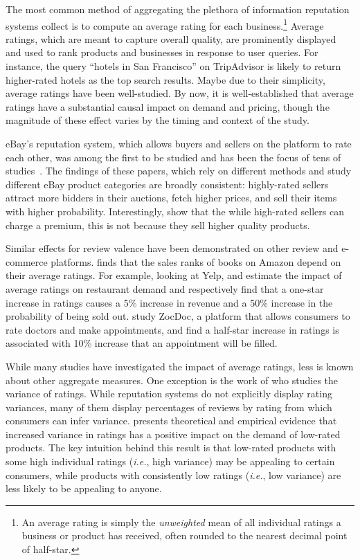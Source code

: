 \documentclass[letter,12pt]{article}
\begin{document}
The most common method of aggregating the plethora of information reputation
systems collect is to compute an average rating for each business.\footnote{An
average rating is simply the \emph{unweighted} mean of all individual ratings
a business or product has received, often rounded to the nearest decimal point
of half-star.} Average ratings, which are meant to capture overall quality,
are prominently displayed and used to rank products and businesses in response
to user queries. For instance, the query ``hotels in San Francisco'' on
TripAdvisor is likely to return higher-rated hotels as the top search results.
Maybe due to their simplicity, average ratings have been well-studied. By now,
it is well-established that average ratings have a substantial causal impact
on demand and pricing, though the magnitude of these effect varies by the
timing and context of the study.

eBay's reputation system, which allows buyers and sellers on the platform to
rate each other, was among the first to be studied and has been the focus of
tens of studies~\citep{ba2002evidence,houser2006reputation,lucking2007pennies,eaton2002value,bajari2003winner,kalyanam2001return,mcdonald2002reputation,cabral2010dynamics,dewally2006reputation,jin2006price}.
The findings of these papers, which rely on different methods and study
different eBay product categories are broadly consistent: highly-rated sellers
attract more bidders in their auctions, fetch higher prices, and sell their
items with higher probability. Interestingly, \citet{jin2006price} show that
the while high-rated sellers can charge a premium, this is not because they
sell higher quality products.

Similar effects for review valence have been demonstrated on other review and
e-commerce platforms. \citet{chevalier2006effect} finds that the sales ranks
of books on Amazon depend on their average ratings. For example, looking at
Yelp, \citet{luca2016reviews} and \citet{anderson2012learning} estimate the
impact of average ratings on restaurant demand and respectively find that a
one-star increase in ratings causes a 5\% increase in revenue and a 50\%
increase in the probability of being sold out. \citet{luca2013digitizing}
study ZocDoc, a platform that allows consumers to rate doctors and make
appointments, and find a half-star increase in ratings is associated with 10\%
increase that an appointment will be filled.

While many studies have investigated the impact of average ratings, less is
known about other aggregate measures. One exception is the work of
\citet{sun2012variance} who studies the variance of ratings. While reputation
systems do not explicitly display rating variances, many of them display
percentages of reviews by rating from which consumers can infer variance.
\citet{sun2012variance} presents theoretical and empirical evidence that
increased variance in ratings has a positive impact on the demand of low-rated
products. The key intuition behind this result is that low-rated products with
some high individual ratings (\emph{i.e.}, high variance) may be appealing to
certain consumers, while products with consistently low ratings (\emph{i.e.},
low variance) are less likely to be appealing to anyone.
\end{document}

